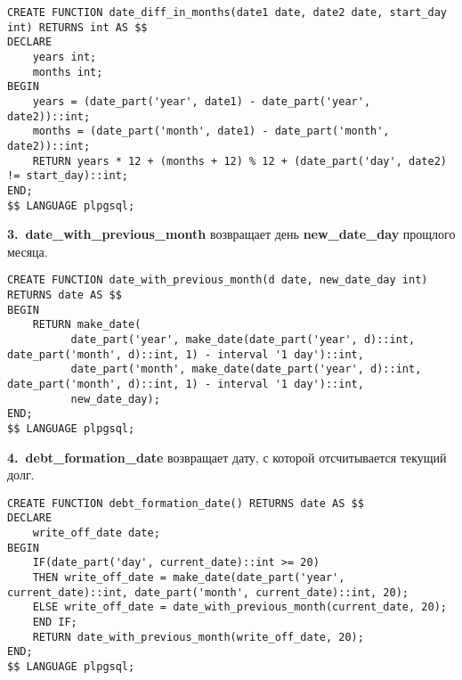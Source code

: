 \documentclass{report}
\begin{document}
\begin{lstlisting}
CREATE FUNCTION date_diff_in_months(date1 date, date2 date, start_day int) RETURNS int AS $$
DECLARE
    years int;
    months int;
BEGIN
    years = (date_part('year', date1) - date_part('year', date2))::int;
    months = (date_part('month', date1) - date_part('month', date2))::int;
    RETURN years * 12 + (months + 12) % 12 + (date_part('day', date2) != start_day)::int;
END;
$$ LANGUAGE plpgsql;
\end{lstlisting}

\textbf{3.\ date\_with\_previous\_month} возвращает день \textbf{new\_date\_day} 
прощлого месяца. 

\begin{lstlisting}
CREATE FUNCTION date_with_previous_month(d date, new_date_day int) RETURNS date AS $$
BEGIN
    RETURN make_date(
          date_part('year', make_date(date_part('year', d)::int, date_part('month', d)::int, 1) - interval '1 day')::int,
          date_part('month', make_date(date_part('year', d)::int, date_part('month', d)::int, 1) - interval '1 day')::int,
          new_date_day);
END;
$$ LANGUAGE plpgsql;
\end{lstlisting}

\textbf{4.\ debt\_formation\_date} возвращает дату, с которой
отсчитывается текущий долг. 

\begin{lstlisting}
CREATE FUNCTION debt_formation_date() RETURNS date AS $$
DECLARE
    write_off_date date;
BEGIN
    IF(date_part('day', current_date)::int >= 20)
    THEN write_off_date = make_date(date_part('year', current_date)::int, date_part('month', current_date)::int, 20);
    ELSE write_off_date = date_with_previous_month(current_date, 20);
    END IF;
    RETURN date_with_previous_month(write_off_date, 20);
END;
$$ LANGUAGE plpgsql;
\end{lstlisting}
\end{document}
